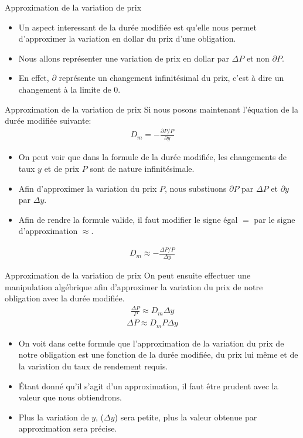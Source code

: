 \documentclass{beamer}
\begin{document}
\begin{frame}{Approximation de la variation de prix}
\begin{itemize}
\item Un aspect interessant de la durée modifiée est qu'elle nous permet d'approximer la variation en dollar du prix d'une obligation. 
\item Nous allons représenter une variation de prix en dollar par $\Delta P$ et non $\partial P$.
\item En effet, $\partial$ représente un changement infinitésimal du prix, c'est à dire un changement à la limite de 0.
\end{itemize}
\end{frame}

\begin{frame}{Approximation de la variation de prix}
Si nous posons maintenant l'équation de la durée modifiée suivante:
\begin{align*}
D_m =-\frac{\partial P / P}{\partial y}
\end{align*}
\begin{itemize}
\item On peut voir que dans la formule de la durée modifiée,  les changements de taux $y$ et de prix $P$ sont de nature infinitésimale. 
\item Afin d'approximer la variation du prix $P$, nous substiuons $\partial P$ par $\Delta P$ et $\partial y$ par $\Delta y$.
\item Afin de rendre la formule valide,  il faut modifier le signe égal $=$ par le signe d'approximation $\approx$.
\end{itemize}
\begin{align*}
D_m \approx -\frac{\Delta P / P}{\Delta y}
\end{align*}
\end{frame}


\begin{frame}{Approximation de la variation de prix}
On peut ensuite effectuer une manipulation algébrique afin d'approximer la variation du prix de notre obligation avec la durée modifiée.
\begin{align*}
\frac{\Delta P}{P} \approx D_m \Delta y
\end{align*}
\begin{align*}
\Delta P \approx D_m P \Delta y
\end{align*}
\begin{itemize}
\item On voit dans cette formule que l'approximation de la variation du prix de notre obligation est une fonction de la durée modifiée, du prix lui même et de la variation du taux de rendement requis.
\item Étant donné qu'il s'agit d'un approximation,  il faut être prudent avec la valeur que nous obtiendrons.
\item Plus la variation de $y$, ($\Delta y$) sera petite,  plus la valeur obtenue par approximation sera précise. 
\end{itemize}
\end{frame}
\end{document}

